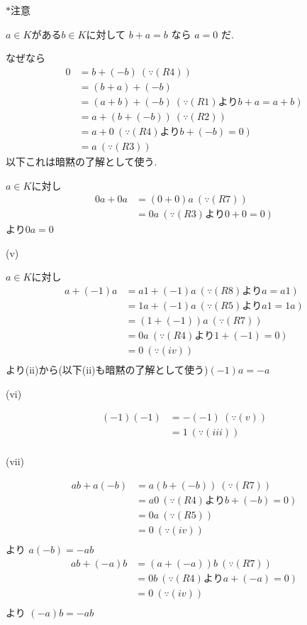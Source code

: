 \documentclass{jsarticle}
\begin{document}
       $\ast$注意
       
       $a\in K$がある$b\in K$に対して
       $b+a=b$
       なら
       $a=0$
       だ.
       
       なぜなら
       \begin{align*}
       0 &= b+(-b) \ (\because (R4))\\
       &= (b+a)+(-b)\\
       &= (a+b)+(-b) \ (\because (R1) より b+a=a+b)\\
       &= a+(b+(-b)) \ (\because (R2))\\
       &= a+0 \ (\because (R4) より b+(-b)=0)\\
       &= a \ (\because (R3))
       \end{align*}
       以下これは暗黙の了解として使う.
       
       $a\in K$に対し
       \begin{align*}
       0a+0a &=(0+0)a \ (\because (R7)) \\
       &= 0a \ (\because (R3)より0+0=0)
       \end{align*}
       より$0a=0$
       
       (v)
       
       $a\in K$に対し
       \begin{align*}
       a+(-1)a &= a1+(-1)a \ (\because (R8)よりa=a1)\\
       &= 1a+(-1)a \ (\because (R5)よりa1=1a)\\
       &= (1+(-1))a \ (\because (R7))\\
       &= 0a \ (\because (R4)より1+(-1)=0)\\
       &= 0 \ (\because (iv))\\
       \end{align*}
       より(ii)から(以下(ii)も暗黙の了解として使う)$(-1)a=-a$
       
       
       (vi)
       
       \begin{align*}
       (-1)(-1) &= -(-1) \ (\because (v))\\
       &= 1 \ (\because (iii))\\
       \end{align*}
       
       (vii)
       
       \begin{align*}
       ab+a(-b) &= a(b+(-b)) \ (\because (R7))\\
       &= a0 \ (\because (R4)よりb+(-b)=0)\\
       &= 0a \ (\because (R5))\\
       &= 0 \ (\because (iv))\\
       \end{align*}
       より
       $a(-b) = -ab$
       \begin{align*}
       ab+(-a)b &= (a+(-a))b \ (\because (R7))\\
       &= 0b \ (\because (R4)よりa+(-a)=0)\\
       &= 0 \ (\because (iv))\\
       \end{align*}
       より
       $(-a)b = -ab$
       
\end{document}
